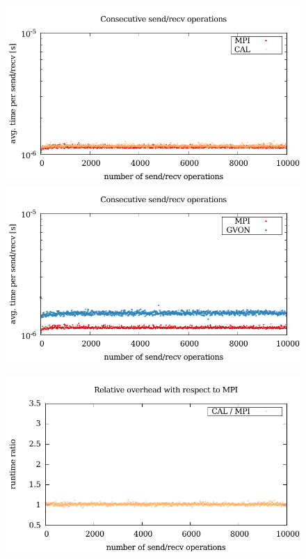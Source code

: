 \begin{figure}[H]
  \begin{minipage}[t]{0.5\textwidth} 
    \includegraphics[width=\textwidth]{plots/50_nsend_cal_laser}
    \includegraphics[width=\textwidth]{plots/50_nsend_gvon_laser}
    \end{minipage}%
  \begin{minipage}[t]{0.5\textwidth}
    \includegraphics[width=\textwidth]{plots/50_nsend_overhead_cal}

\end{minipage}
\end{figure}
